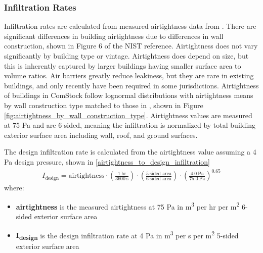 \subsubsection{Infiltration Rates}
Infiltration rates are calculated from measured airtightness data from \citep{nist_infiltration_data}. There are significant differences in building airtightness due to differences in wall construction, shown in Figure 6 of the NIST reference. Airtightness does not vary significantly by building type or vintage. Airtightness does depend on size, but this is inherently captured by larger buildings having smaller surface area to volume ratios. Air barriers greatly reduce leakiness, but they are rare in existing buildings, and only recently have been required in some jurisdictions. Airtightness of buildings in ComStock follow lognormal distributions with airtightness means by wall construction type matched to those in \citep{nist_infiltration_data}, shown in Figure \ref{fig:airtightness_by_wall_construction_type}.
Airtightness values are measured at 75 Pa and are 6-sided, meaning the infiltration is normalized by total building exterior surface area including wall, roof, and ground surfaces.

The design infiltration rate is calculated from the airtightness value assuming a 4 Pa design pressure, shown in \ref{airtightness_to_design_infiltration}
\begin{align}
\label{airtightness_to_design_infiltration}
I_{\text{design}} = \text{airtightness} \cdot \left(\frac{1\ \text{hr}}{3600\ \text{s}}\right) \cdot \left(\frac{5\ \text{sided area}}{6\ \text{sided area}}\right) \cdot \left(\frac{4.0\ \text{Pa}}{75.0\ \text{Pa}}\right)^{0.65}
\end{align}
where:\\
\begin{itemize}
\item \textbf{airtightness} is the measured airtightness at 75 Pa in m\textsuperscript{3} per hr per m\textsuperscript{2} 6-sided exterior surface area\\
\item \textbf{I\textsubscript{design}} is the design infiltration rate at 4 Pa in m\textsuperscript{3} per s per m\textsuperscript{2} 5-sided exterior surface area\\
\end{itemize}

